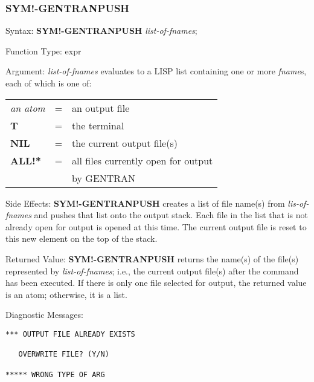\subsubsection{SYM!-GENTRANPUSH}
\begin{describe}{Syntax:}
{\bf SYM!-GENTRANPUSH} {\it  list-of-fnames\/};
\end{describe} 
\begin{describe}{Function Type:}
expr
\end{describe} 
\begin{describe}{Argument:}
{\it list-of-fnames\/} evaluates to a LISP list containing one or more 
{\it fname}s, each of which is one of:

\begin{tabular}{lll}
{\it an atom} & = &  an output file\\
{\bf T} & = & the terminal\\
{\bf NIL} & = & the current output file(s)\\
{\bf ALL!*} & = & all files currently open for output \\
& & by GENTRAN\\
\end{tabular}
\end{describe} 
\begin{describe}{Side Effects:}
{\bf SYM!-GENTRANPUSH} creates a list of file name(s) from
{\it lis-of-fnames\/}
and pushes that list onto the output stack.  Each file in the list that
is not already open for output is opened at this time.  The current
output file is reset to this new element on the top of the stack.
\end{describe} 
\begin{describe}{Returned Value:}
{\bf SYM!-GENTRANPUSH} returns the name(s) of the file(s) represented by 
{\it list-of-fnames\/}; i.e., the current output
file(s) after the command has been executed.  If there is
only one file selected for output, the returned value is an
atom; otherwise, it is a list.
\end{describe} 
\begin{describe}{Diagnostic Messages:}
\begin{verbatim}
*** OUTPUT FILE ALREADY EXISTS

   OVERWRITE FILE? (Y/N)

***** WRONG TYPE OF ARG
\end{verbatim}
\end{describe}

